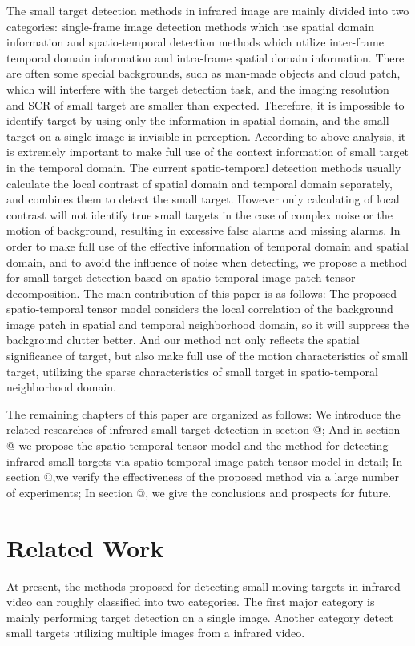 \documentclass[journal]{IEEEtran}
\makeatletter
\newcommand{\Rmnum}[1]{\expandafter\@slowromancap\romannumeral #1@}
\makeatother
\begin{document}
The small target detection methods in infrared image are mainly divided into two categories: single-frame image detection methods which use spatial domain information and spatio-temporal detection methods which utilize inter-frame temporal domain information and intra-frame spatial domain information\cite{li2016novel}. There are often some special backgrounds, such as man-made objects and cloud patch, which will interfere with the target detection task, and the imaging resolution and SCR of small target are smaller than expected. Therefore, it is impossible to identify target by using only the information in spatial domain, and the small target on a single image is invisible in perception. According to above analysis, it is extremely important to make full use of the context information of small target in the temporal domain. The current spatio-temporal detection methods usually calculate the local contrast of spatial domain and temporal domain separately, and combines them to detect the small target. However only calculating of local contrast will not identify true small targets in the case of complex noise or the motion of background, resulting in excessive false alarms and missing alarms. In order to make full use of the effective information of temporal domain and spatial domain, and to avoid the influence of noise when detecting, we propose a method for small target detection based on spatio-temporal image patch tensor decomposition. The main contribution of this paper is as follows: The proposed spatio-temporal tensor model considers the local correlation of the background image patch in spatial and temporal neighborhood domain, so it will suppress the background clutter better. And our method not only reflects the spatial significance of target, but also make full use of the motion characteristics of small target, utilizing the sparse characteristics of small target in spatio-temporal neighborhood domain.

The remaining chapters of this paper are organized as follows: We introduce the related researches of infrared small target detection in section \Rmnum{2}; And in section \Rmnum{3} we propose the spatio-temporal tensor model and the method for detecting infrared small targets via spatio-temporal image patch tensor model in detail; In section \Rmnum{4},we verify the effectiveness of the proposed method via a large number of experiments; In section \Rmnum{5}, we give the conclusions and prospects for future.

%
%
\section{Related Work}
At present, the methods proposed for detecting small moving targets in infrared video can roughly classified into two categories. The first major category is mainly performing target detection on a single image. Another category detect small targets utilizing multiple images from a infrared video.
\end{document}
